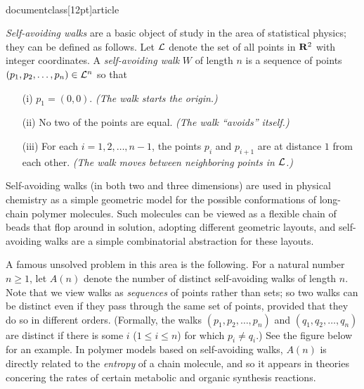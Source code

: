 \\documentclass[12pt]{article}
\def\L{{\cal L}}
\def\L{{\cal L}}
\begin{document}
\begin{enumerate}
{\em Self-avoiding walks} are a basic object of study
in the area of statistical physics; they can be defined as follows.
Let $\L$ denote the set of all points in ${\bf R}^2$
with integer coordinates.
A {\em self-avoiding walk} $W$ of length $n$ is
a sequence of points $(p_1, p_2, \ldots, p_n) \in \L^n$
so that
\begin{itemize}
\item[(i)] $p_1 = (0,0)$.  {\em (The walk starts the origin.)}
\item[(ii)] No two of the points are equal.
{\em (The walk ``avoids'' itself.)}
\item[(iii)] For each $i = 1, 2, \ldots, n-1$,
the points $p_i$ and $p_{i+1}$ are at distance $1$ from each other.
{\em (The walk moves between neighboring points in $\L$.)}
\end{itemize}
Self-avoiding walks (in both two and three dimensions)
are used in physical chemistry as a simple geometric model
for the possible conformations of long-chain polymer molecules.
Such molecules can be viewed as a flexible chain of beads
that flop around in solution, adopting different geometric layouts,
and self-avoiding walks are a simple combinatorial abstraction
for these layouts.

A famous unsolved problem in this area is the following.
For a natural number $n \geq 1$, let $A(n)$ denote the number of
distinct self-avoiding walks of length $n$.
Note that we view walks as {\em sequences} of points
rather than sets; so two walks can be distinct even if they
pass through the same set of points, provided that
they do so in different orders.
(Formally, the walks $(p_1, p_2, \ldots, p_n)$
and $(q_1, q_2, \ldots, q_n)$ are distinct if there is some
$i$ ($1 \leq i \leq n$) for which $p_i \neq q_i$.)
See the figure below for an example.
In polymer models based on self-avoiding walks,
$A(n)$ is directly related to the {\em entropy} of
a chain molecule, and so it appears in theories concering
the rates of certain metabolic and organic synthesis reactions.

\begin{figure}[h]
\begin{center}



\end{center}
\end{figure}
\end{enumerate}
\end{document}
